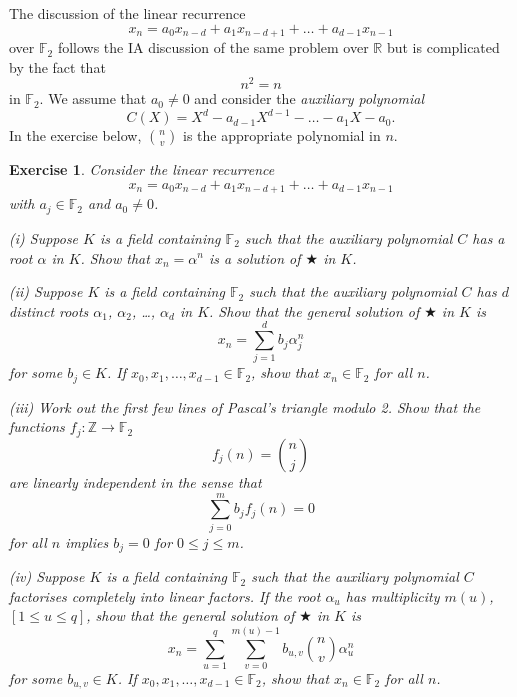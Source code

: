 \documentclass[12pt,a4paper]{article}
\theoremstyle{plain}
\newtheorem{exercise}[theorem]{Exercise}
\theoremstyle{definition}
\begin{document}
    The discussion of the linear recurrence
    \[x_{n}=a_{0}x_{n-d}+a_{1}x_{n-d+1}+\dots+a_{d-1}x_{n-1}\]
    over ${\mathbb F}_{2}$ follows the IA discussion
    of the same problem over ${\mathbb R}$ but
    is complicated by the fact that
    \[n^{2}=n\]
    in ${\mathbb F}_{2}$. We assume that $a_{0}\neq 0$
    and consider the \emph{auxiliary polynomial}
    \[C(X)=X^{d}-a_{d-1}X^{d-1}-\dots-a_{1}X-a_{0}.\]
    In the exercise below, ${\displaystyle \binom{n}{v}}$
    is the appropriate polynomial in $n$.
    \begin{exercise}
        \label{Solve recurrence}
        Consider the linear recurrence
        \begin{equation*}
            x_{n}=a_{0}x_{n-d}+a_{1}x_{n-d+1}+\ldots+a_{d-1}x_{n-1}\tag*{$\bigstar$}
        \end{equation*}
        with $a_{j}\in {\mathbb F}_{2}$ and $a_{0}\neq 0$.

        (i) Suppose $K$ is a field containing ${\mathbb F}_{2}$
        such that the auxiliary polynomial $C$ has a root $\alpha$
        in $K$. Show that $x_{n}=\alpha^{n}$ is a solution of $\bigstar$ in $K$.

        (ii) Suppose $K$ is a field containing ${\mathbb F}_{2}$
        such that the auxiliary polynomial $C$ has
        $d$ distinct roots $\alpha_{1}$, $\alpha_{2}$,
        \dots, $\alpha_{d}$ in $K$. Show that the general solution
        of $\bigstar$ in $K$ is
        \[x_{n}=\sum_{j=1}^{d}b_{j}\alpha_{j}^{n}\]
        for some $b_{j}\in K$.
        If $x_{0},x_{1},\dots,x_{d-1}\in {\mathbb F}_{2}$,
        show that $x_{n}\in {\mathbb F}_{2}$ for all $n$.

        (iii) Work out the first few lines of Pascal's triangle
        modulo 2. Show that the functions
        $f_{j}:{\mathbb Z}\rightarrow{\mathbb F}_{2}$
        \[f_{j}(n)=\binom{n}{j}\]
        are linearly independent in the sense that
        \[\sum_{j=0}^{m}b_{j}f_{j}(n)=0\]
        for all $n$ implies $b_{j}=0$ for $0\leq j\leq m$.

        (iv) Suppose $K$ is a field containing ${\mathbb F}_{2}$
        such that the auxiliary polynomial $C$ factorises
        completely into linear factors. If the
        root $\alpha_{u}$ has multiplicity $m(u)$, $[1\leq u\leq q]$,
        show that the general solution
        of $\bigstar$ in $K$ is
        \[x_{n}=\sum_{u=1}^{q}\sum_{v=0}^{m(u)-1}
        b_{u,v}\binom{n}{v}\alpha_{u}^{n}\]
        for some $b_{u,v}\in K$.
        If $x_{0},x_{1},\dots,x_{d-1}\in {\mathbb F}_{2}$,
        show that $x_{n}\in {\mathbb F}_{2}$ for all $n$.
    \end{exercise}
\end{document}
